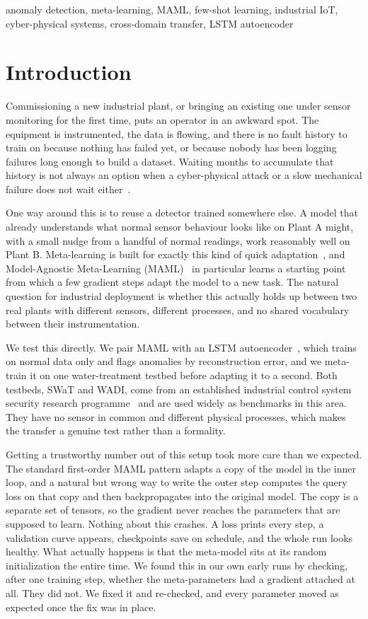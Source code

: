 \documentclass[conference]{IEEEtran}
\begin{document}
\begin{IEEEkeywords}
anomaly detection, meta-learning, MAML, few-shot learning, industrial IoT,
cyber-physical systems, cross-domain transfer, LSTM autoencoder
\end{IEEEkeywords}

\section{Introduction}

Commissioning a new industrial plant, or bringing an existing one under
sensor monitoring for the first time, puts an operator in an awkward spot.
The equipment is instrumented, the data is flowing, and there is no fault
history to train on because nothing has failed yet, or because nobody has
been logging failures long enough to build a dataset. Waiting months to
accumulate that history is not always an option when a cyber-physical attack
or a slow mechanical failure does not wait either~\cite{cook2020}.

One way around this is to reuse a detector trained somewhere else. A model
that already understands what normal sensor behaviour looks like on Plant A
might, with a small nudge from a handful of normal readings, work reasonably
well on Plant B. Meta-learning is built for exactly this kind of quick
adaptation~\cite{hospedales2022}, and Model-Agnostic Meta-Learning
(MAML)~\cite{finn2017} in particular learns a starting point from which a
few gradient steps adapt the model to a new task. The natural question for
industrial deployment is whether this actually holds up between two real
plants with different sensors, different processes, and no shared
vocabulary between their instrumentation.

We test this directly. We pair MAML with an LSTM
autoencoder~\cite{malhotra2016}, which trains on normal data only and flags
anomalies by reconstruction error, and we meta-train it on one
water-treatment testbed before adapting it to a second. Both testbeds, SWaT
and WADI, come from an established industrial control system security
research programme~\cite{mathur2016,ahmed2017} and are used widely as
benchmarks in this area. They have no sensor in common and different
physical processes, which makes the transfer a genuine test rather than a
formality.

Getting a trustworthy number out of this setup took more care than we
expected. The standard first-order MAML pattern adapts a copy of the model
in the inner loop, and a natural but wrong way to write the outer step
computes the query loss on that copy and then backpropagates into the
original model. The copy is a separate set of tensors, so the gradient never
reaches the parameters that are supposed to learn. Nothing about this
crashes. A loss prints every step, a validation curve appears, checkpoints
save on schedule, and the whole run looks healthy. What actually happens is
that the meta-model sits at its random initialization the entire time. We
found this in our own early runs by checking, after one training step,
whether the meta-parameters had a gradient attached at all. They did not.
We fixed it and re-checked, and every parameter moved as expected once the
fix was in place.
\end{document}
